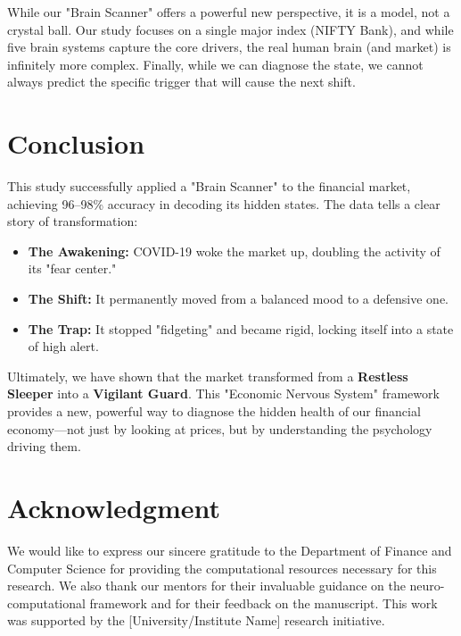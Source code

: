 \documentclass[conference]{IEEEtran}
\begin{document}
While our "Brain Scanner" offers a powerful new perspective, it is a model, not a crystal ball. Our study focuses on a single major index (NIFTY Bank), and while five brain systems capture the core drivers, the real human brain (and market) is infinitely more complex. Finally, while we can diagnose the state, we cannot always predict the specific trigger that will cause the next shift.

\section{Conclusion}

This study successfully applied a "Brain Scanner" to the financial market, achieving 96--98\% accuracy in decoding its hidden states. The data tells a clear story of transformation:

\begin{itemize}
    \item \textbf{The Awakening:} COVID-19 woke the market up, doubling the activity of its "fear center."
    \item \textbf{The Shift:} It permanently moved from a balanced mood to a defensive one.
    \item \textbf{The Trap:} It stopped "fidgeting" and became rigid, locking itself into a state of high alert.
\end{itemize}

Ultimately, we have shown that the market transformed from a \textbf{Restless Sleeper} into a \textbf{Vigilant Guard}. This "Economic Nervous System" framework provides a new, powerful way to diagnose the hidden health of our financial economy—not just by looking at prices, but by understanding the psychology driving them.

\section*{Acknowledgment}
We would like to express our sincere gratitude to the Department of Finance and Computer Science for providing the computational resources necessary for this research. We also thank our mentors for their invaluable guidance on the neuro-computational framework and for their feedback on the manuscript. This work was supported by the [University/Institute Name] research initiative.
\end{document}
